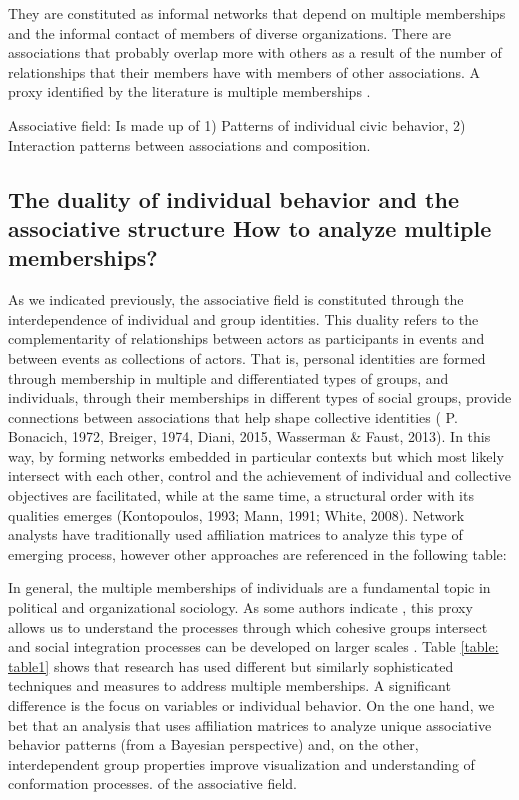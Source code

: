 They are constituted as informal networks that depend on multiple memberships and the informal contact of members of diverse organizations. There are associations that probably overlap more with others as a result of the number of relationships that their members have with members of other associations. A proxy identified by the literature is multiple memberships \parencite{moody_structural_2003, paxton_association_2007,pena_lopez_capital_2018}. 
\bigskip

Associative field: Is made up of 1) Patterns of individual civic behavior, 2) Interaction patterns between associations and composition. 

\subsection{The duality of individual behavior and the associative structure
How to analyze multiple memberships?}

As we indicated previously, the associative field is constituted through the interdependence of individual and group identities. This duality refers to the complementarity of relationships between actors as participants in events and between events as collections of actors. That is, personal identities are formed through membership in multiple and differentiated types of groups, and individuals, through their memberships in different types of social groups, provide connections between associations that help shape collective identities ( P. Bonacich, 1972, Breiger, 1974, Diani, 2015, Wasserman & Faust, 2013). In this way, by forming networks embedded in particular contexts but which most likely intersect with each other, control and the achievement of individual and collective objectives are facilitated, while at the same time, a structural order with its qualities emerges (Kontopoulos, 1993; Mann, 1991; White, 2008). Network analysts have traditionally used affiliation matrices to analyze this type of emerging process, however other approaches are referenced in the following table:
\bigskip

In general, the multiple memberships of individuals are a fundamental topic in political and organizational sociology. As some authors indicate \parencite{friedkin_social_2004,moody_structural_2003}, this proxy allows us to understand the processes through which cohesive groups intersect and social integration processes can be developed on larger scales \parencite{blau_inequality_1977}. Table \ref{table: table1} shows that research has used different but similarly sophisticated techniques and measures to address multiple memberships. A significant difference is the focus on variables or individual behavior. On the one hand, we bet that an analysis that uses affiliation matrices to analyze unique associative behavior patterns (from a Bayesian perspective) and, on the other, interdependent group properties improve visualization and understanding of conformation processes. of the associative field.
\bigskip

